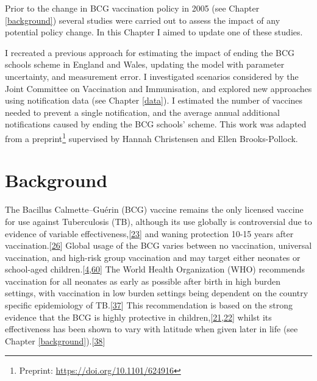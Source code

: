 \documentclass[11pt,twoside]{bristolthesis}
\begin{document}
  Prior to the change in BCG vaccination policy in 2005 (see Chapter \ref{background}) several studies were carried out to assess the impact of any potential policy change. In this Chapter I aimed to update one of these studies.
  
  I recreated a previous approach for estimating the impact of ending the BCG schools scheme in England and Wales, updating the model with parameter uncertainty, and measurement error. I investigated scenarios considered by the Joint Committee on Vaccination and Immunisation, and explored new approaches using notification data (see Chapter \ref{data}). I estimated the number of vaccines needed to prevent a single notification, and the average annual additional notifications caused by ending the BCG schools' scheme. This work was adapted from a preprint\footnote{Preprint: \url{https://doi.org/10.1101/624916}} supervised by Hannah Christensen and Ellen Brooks-Pollock.
  
  \hypertarget{background-3}{%
  \section{Background}\label{background-3}}
  
  The Bacillus Calmette--Guérin (BCG) vaccine remains the only licensed vaccine for use against Tuberculosis (TB), although its use globally is controversial due to evidence of variable effectiveness,{[}\protect\hyperlink{ref-Mangtani2014a}{23}{]} and waning protection 10-15 years after vaccination.{[}\protect\hyperlink{ref-Abubakar2013}{26}{]} Global usage of the BCG varies between no vaccination, universal vaccination, and high-risk group vaccination and may target either neonates or school-aged children.{[}\protect\hyperlink{ref-Zwerling2011a}{4},\protect\hyperlink{ref-Pilger2012b}{60}{]} The World Health Organization (WHO) recommends vaccination for all neonates as early as possible after birth in high burden settings, with vaccination in low burden settings being dependent on the country specific epidemiology of TB.{[}\protect\hyperlink{ref-WHO2017}{37}{]} This recommendation is based on the strong evidence that the BCG is highly protective in children,{[}\protect\hyperlink{ref-Rodrigues1993}{21},\protect\hyperlink{ref-Colditz1994}{22}{]} whilst its effectiveness has been shown to vary with latitude when given later in life (see Chapter \ref{background}).{[}\protect\hyperlink{ref-Mangtani2014}{38}{]}
  
\end{document}
